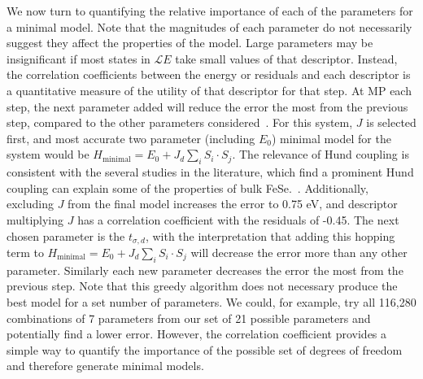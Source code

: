 

We now turn to quantifying the relative importance of each of the parameters for a minimal model.
Note that the magnitudes of each parameter do not necessarily suggest they affect the properties of the model.
Large parameters may be insignificant if most states in $\mathcal{L}E$ take small values of that descriptor.
Instead, the correlation coefficients between the energy or residuals and each descriptor is a quantitative measure of the utility of that descriptor for that step.
At MP each step, the next parameter added will reduce the error the most from the previous step, compared to the other parameters considered~\cite{MP_Zhang1993}.
For this system, $J$ is selected first, and most accurate two parameter (including $E_0$) minimal model for the system would be $H_\text{minimal} = E_0 + J_d \sum_i S_i \cdot S_j$. 
The relevance of Hund coupling is consistent with the several studies in the literature, which find a prominent Hund coupling can explain some of the properties of bulk FeSe.~\cite{demedici_hunds_2011,de_medici_janus-faced_2011,georges_strong_2013,busemeyer_competing_2016}.
\BDB{Probably unnecessary [[[}Additionally, excluding $J$ from the final model increases the error to 0.75 eV, and descriptor multiplying $J$ has a correlation coefficient with the residuals of -0.45.\BDB{]]]}
The next chosen parameter is the $t_{\sigma,d}$, with the interpretation that adding this hopping term to $H_\text{minimal} = E_0 + J_d \sum_i S_i \cdot S_j$ will decrease the error more than any other parameter. 
Similarly each new parameter decreases the error the most from the previous step.
Note that this greedy algorithm does not necessary produce the best model for a set number of parameters.
We could, for example, try all 116,280 combinations of 7 parameters from our set of 21 possible parameters and potentially find a lower error.
However, the correlation coefficient provides a simple way to quantify the importance of the possible set of degrees of freedom and therefore generate minimal models.

